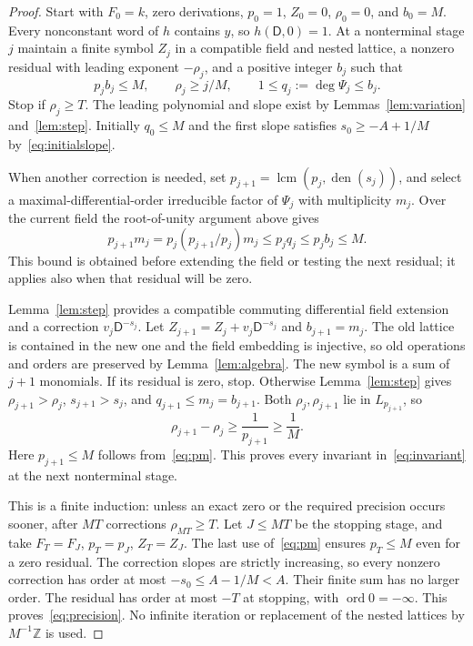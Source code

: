 \documentclass{article}
\newcommand{\DD}{\mathsf D}
\newcommand{\ord}{\operatorname{ord}}
\begin{document}
\begin{proof}
Start with $F_0=k$, zero derivations, $p_0=1$, $Z_0=0$, $\rho_0=0$, and $b_0=M$. Every nonconstant word of $h$ contains $y$, so $h(\DD,0)=1$. At a nonterminal stage $j$ maintain a finite symbol $Z_j$ in a compatible field and nested lattice, a nonzero residual with leading exponent $-\rho_j$, and a positive integer $b_j$ such that
\[
 p_jb_j\leq M,\qquad \rho_j\geq j/M,\qquad
 1\leq q_j:=\deg\Psi_j\leq b_j.
 \tag{5.5}\label{eq:invariant}
\]
Stop if $\rho_j\geq T$. The leading polynomial and slope exist by Lemmas~\ref{lem:variation} and~\ref{lem:step}. Initially $q_0\leq M$ and the first slope satisfies $s_0\geq-A+1/M$ by~\eqref{eq:initialslope}.

When another correction is needed, set $p_{j+1}=\operatorname{lcm}(p_j,\operatorname{den}(s_j))$, and select a maximal-differential-order irreducible factor of $\Psi_j$ with multiplicity $m_j$. Over the current field the root-of-unity argument above gives
\[
 p_{j+1}m_j=p_j(p_{j+1}/p_j)m_j\leq p_jq_j\leq p_jb_j\leq M.
 \tag{5.6}\label{eq:pm}
\]
This bound is obtained before extending the field or testing the next residual; it applies also when that residual will be zero.

Lemma~\ref{lem:step} provides a compatible commuting differential field extension and a correction $v_j\DD^{-s_j}$. Let $Z_{j+1}=Z_j+v_j\DD^{-s_j}$ and $b_{j+1}=m_j$. The old lattice is contained in the new one and the field embedding is injective, so old operations and orders are preserved by Lemma~\ref{lem:algebra}. The new symbol is a sum of $j+1$ monomials. If its residual is zero, stop. Otherwise Lemma~\ref{lem:step} gives $\rho_{j+1}>\rho_j$, $s_{j+1}>s_j$, and $q_{j+1}\leq m_j=b_{j+1}$. Both $\rho_j,\rho_{j+1}$ lie in $L_{p_{j+1}}$, so
\[
 \rho_{j+1}-\rho_j\geq\frac1{p_{j+1}}\geq\frac1M.
\]
Here $p_{j+1}\leq M$ follows from~\eqref{eq:pm}. This proves every invariant in~\eqref{eq:invariant} at the next nonterminal stage.

This is a finite induction: unless an exact zero or the required precision occurs sooner, after $MT$ corrections $\rho_{MT}\geq T$. Let $J\leq MT$ be the stopping stage, and take $F_T=F_J$, $p_T=p_J$, $Z_T=Z_J$. The last use of~\eqref{eq:pm} ensures $p_T\leq M$ even for a zero residual. The correction slopes are strictly increasing, so every nonzero correction has order at most
$-s_0\leq A-1/M<A$. Their finite sum has no larger order. The residual has order at most $-T$ at stopping, with $\ord0=-\infty$. This proves~\eqref{eq:precision}. No infinite iteration or replacement of the nested lattices by $M^{-1}\mathbb Z$ is used.
\end{proof}
\end{document}
